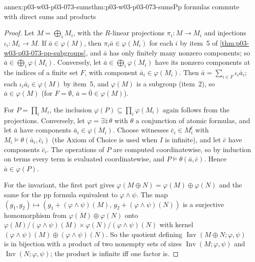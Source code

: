 \begin{annexitem}{annex:p03-w03-p03-073-sums}{thm:p03-w03-p03-073-sums}{Pp formulas commute with direct sums and products}
\begin{proof}
Let \(M=\bigoplus_iM_i\), with the \(R\)-linear projections
\(\pi_i:M\to M_i\) and injections \(\iota_i:M_i\to M\). If
\(\bar a\in\varphi(M)\), then \(\pi_i\bar a\in\varphi(M_i)\) for each \(i\)
by item~5 of \cref{thm:p03-w03-p03-073-pp-subgroups}, and \(\bar a\) has
only finitely many nonzero components; so
\(\bar a\in\bigoplus_i\varphi(M_i)\). Conversely, let
\(\bar a\in\bigoplus_i\varphi(M_i)\) have its nonzero components at the
indices of a finite set \(F\), with component \(\bar a_i\in\varphi(M_i)\).
Then \(\bar a=\sum_{i\in F}\iota_i\bar a_i\); each
\(\iota_i\bar a_i\in\varphi(M)\) by item~5, and \(\varphi(M)\) is a
subgroup (item~2), so \(\bar a\in\varphi(M)\) (for \(F=\emptyset\),
\(\bar a=\bar0\in\varphi(M)\)).

For \(P=\prod_iM_i\), the inclusion
\(\varphi(P)\subseteq\prod_i\varphi(M_i)\) again follows from the
projections. Conversely, let \(\varphi=\exists\bar z\,\theta\) with
\(\theta\) a conjunction of atomic formulas, and let \(\bar a\) have
components \(\bar a_i\in\varphi(M_i)\). Choose witnesses
\(\bar c_i\in M_i^l\) with \(M_i\models\theta(\bar a_i,\bar c_i)\) (the
Axiom of Choice is used when \(I\) is infinite), and let \(\bar c\) have
components \(\bar c_i\). The operations of \(P\) are computed
coordinatewise, so by induction on terms every term is evaluated
coordinatewise, and \(P\models\theta(\bar a,\bar c)\). Hence
\(\bar a\in\varphi(P)\).

For the invariant, the first part gives
\(\varphi(M\oplus N)=\varphi(M)\oplus\varphi(N)\) and the same for the pp
formula equivalent to \(\varphi\wedge\psi\). The map
\((g_1,g_2)\mapsto(g_1+(\varphi\wedge\psi)(M),\,g_2+(\varphi\wedge\psi)(N))\)
is a surjective homomorphism from \(\varphi(M)\oplus\varphi(N)\) onto
\(\varphi(M)/(\varphi\wedge\psi)(M)\times\varphi(N)/(\varphi\wedge\psi)(N)\)
with kernel \((\varphi\wedge\psi)(M)\oplus(\varphi\wedge\psi)(N)\). So the
quotient defining \(\operatorname{Inv}(M\oplus N;\varphi,\psi)\) is in
bijection with a product of two nonempty sets of sizes
\(\operatorname{Inv}(M;\varphi,\psi)\) and
\(\operatorname{Inv}(N;\varphi,\psi)\); the product is infinite iff one
factor is.
\end{proof}
\end{annexitem}

